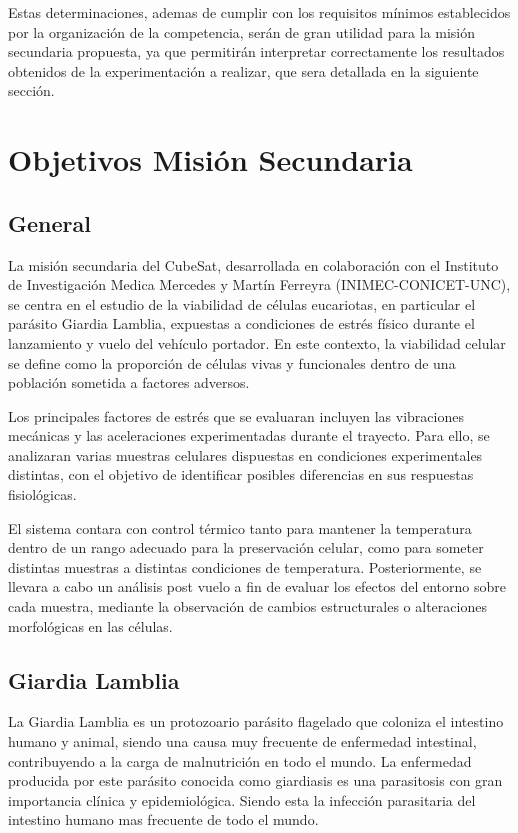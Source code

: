 Estas determinaciones, ademas de cumplir con los requisitos mínimos establecidos por la
organización de la competencia, serán de gran utilidad para la misión secundaria propuesta,
ya que permitirán interpretar correctamente los resultados obtenidos de la experimentación
a realizar, que sera detallada en la siguiente sección.

\section{Objetivos Misión Secundaria}
  \subsection{General}
    La misión secundaria del CubeSat, desarrollada en colaboración con el Instituto de Investigación
    Medica Mercedes y Martín Ferreyra (INIMEC-CONICET-UNC), se centra en
    el estudio de la viabilidad de células eucariotas, en particular el parásito Giardia Lamblia,
    expuestas a condiciones de estrés físico durante el lanzamiento y vuelo del vehículo portador. En
    este contexto, la viabilidad celular se define como la proporción de células vivas y
    funcionales dentro de una población sometida a factores adversos.

    Los principales factores de estrés que se evaluaran incluyen las vibraciones mecánicas y
    las aceleraciones experimentadas durante el trayecto. Para ello, se analizaran varias muestras
    celulares dispuestas en condiciones experimentales distintas, con el objetivo de identificar
    posibles diferencias en sus respuestas fisiológicas.

    El sistema contara con control térmico tanto para mantener la temperatura dentro de
    un rango adecuado para la preservación celular, como para someter distintas muestras a
    distintas condiciones de temperatura. Posteriormente, se llevara a cabo un análisis post vuelo a
    fin de evaluar los efectos del entorno sobre cada muestra, mediante la observación de
    cambios estructurales o alteraciones morfológicas en las células.

  \subsection{Giardia Lamblia}
    La Giardia Lamblia es un protozoario parásito flagelado que coloniza el intestino humano
    y animal, siendo una causa muy frecuente de enfermedad intestinal, contribuyendo a la carga
    de malnutrición en todo el mundo. La enfermedad producida por este parásito conocida
    como giardiasis es una parasitosis con gran importancia clínica y epidemiológica. Siendo esta
    la infección parasitaria del intestino humano mas frecuente de todo el mundo.

